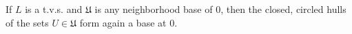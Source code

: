 If $L$ is a t.v.s. and $\mathfrak{U}$ is any neighborhood base of $0$, then the closed, circled hulls of the sets $U \in \mathfrak{U}$ form again a base at $0$.
